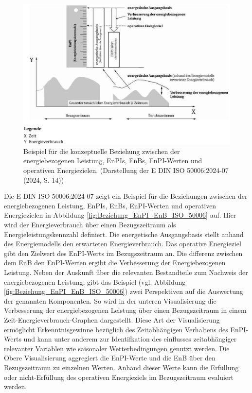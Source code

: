 \begin{figure}[H]
    \centering
    \includegraphics[width=1\textwidth]{../../Ressourcen/Abbildungen/ISO_50006_Beispiel_EnPI_EnB.jpg}
    \caption{Beispiel für die konzeptuelle Beziehung zwischen der energiebezogenen Leistung, EnPIs, EnBs, EnPI-Werten und operativen Energiezielen. (Darstellung der E DIN ISO 50006:2024-07 (2024, S. 14))}
    \label{fig:Beziehung_EnPI_EnB_ISO_50006}
\end{figure}

Die E DIN ISO 50006:2024-07 zeigt ein Beispiel für die Beziehungen zwischen der energiebezogenen Leistung, EnPIs, EnBs, EnPI-Werten und operativen Energiezielen 
in Abbildung \eqref{fig:Beziehung_EnPI_EnB_ISO_50006} auf.
Hier wird der Energieverbrauch über einen Bezugszeitraum als Energieleistungskennzahl definiert.
Die energetische Ausgangsbasis stellt anhand des Energiemodells den erwarteten Energieverbrauch.
Das operative Energieziel gibt den Zielwert des EnPI-Werts im Bezugszeitraum an. 
Die differenz zwischen dem EnB den EnPI-Werten ergibt die Verbesserung der Energiebezogenen Leistung.
Neben der Auskunft über die relevanten Bestandteile zum Nachweis der energiebezogenen Leistung, gibt das Beispiel (vgl. Abbildung \eqref{fig:Beziehung_EnPI_EnB_ISO_50006}) 
zwei Perspektiven auf die Auswertung der genannten Komponenten.
So wird in der unteren Visualisierung die Verbesserung der energiebezogenen Leistung über einen Bezugszeitraum in einem Zeit-Energieverbrauch-Graphen dargestellt.
Diese Art der Visualisierung ermöglicht Erkenntnisgewinne bezüglich des Zeitabhängigen Verhaltens des EnPI-Werts und kann unter anderem zur Identifkation des 
einflusses zeitabhängiger relevanter Variablen wie saisonaler Wetterbedingungen genutzt werden. 
Die Obere Visualisierung aggregiert die EnPI-Werte und die EnB über den Bezugszeitraum zu einzelnen Werten. 
Anhand dieser Werte kann die Erfüllung oder nicht-Erfüllung des operativen Energieziels im Bezugszeitraum evaluiert werden.

